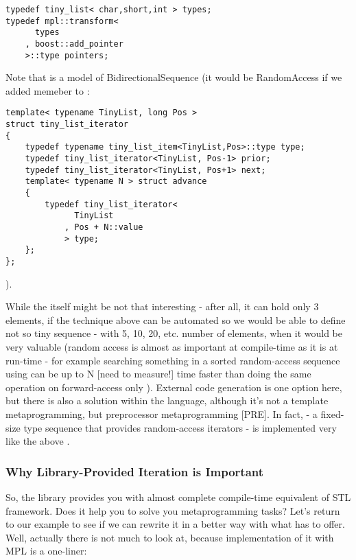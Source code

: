 \documentclass{netobjectdays}
\begin{document}
{\footnotesize
\begin{verbatim}
typedef tiny_list< char,short,int > types;
typedef mpl::transform<
      types
    , boost::add_pointer
    >::type pointers;
\end{verbatim}
}

Note that  is a model of 
BidirectionalSequence (it would be RandomAccess if 
we added  memeber to :

{\footnotesize
\begin{verbatim}
template< typename TinyList, long Pos >
struct tiny_list_iterator
{
    typedef typename tiny_list_item<TinyList,Pos>::type type;
    typedef tiny_list_iterator<TinyList, Pos-1> prior;
    typedef tiny_list_iterator<TinyList, Pos+1> next;
    template< typename N > struct advance
    {
        typedef tiny_list_iterator<
              TinyList
            , Pos + N::value
            > type;
    };
};
\end{verbatim}
}

).

While the  itself might be not that 
interesting - after all, it can hold only 3 elements, if 
the technique above can be automated so we would be able to 
define not so tiny sequence - with 5, 10, 20, etc. number 
of elements, when it would be very valuable (random access 
is almost as important at compile-time as it is at run-time 
- for example searching something in a sorted random-access 
sequence using  can be up to N 
[need to measure!] time faster than doing the same operation 
on forward-access only ). External code generation 
is one option here, but there is also a solution within the 
language, although it's not a template metaprogramming, 
but preprocessor metaprogramming [PRE]. In fact, 
 - a fixed-size type sequence that 
provides random-access iterators - is implemented very like 
the above . 

\subsubsection{Why Library-Provided Iteration is Important}

So, the library provides you with almost complete compile-time 
equivalent of STL framework. Does it help you to solve you 
metaprogramming tasks? Let's return to our  
example to see if we can rewrite it in a better way with what 
 has to offer. Well, actually there is not 
much to look at, because implementation of it with MPL is a 
one-liner:
\end{document}
